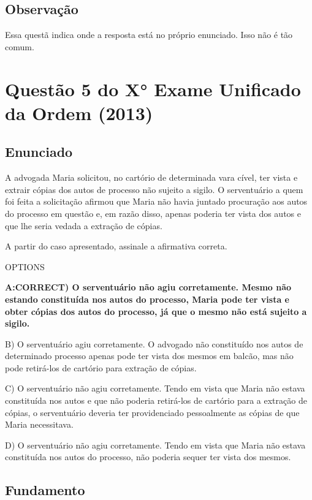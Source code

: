 \documentclass[12pt]{article}
\begin{document}
\subsection{Observação}

Essa questã indica onde a resposta está no próprio enunciado. Isso não é tão comum.

\section{Questão 5 do X° Exame Unificado da Ordem (2013)}

\subsection{Enunciado}

A advogada Maria solicitou, no cartório de determinada vara 
cível, ter vista e extrair cópias dos autos de processo não 
sujeito a sigilo. O serventuário a quem foi feita a solicitação 
afirmou que Maria não havia juntado procuração aos autos do 
processo em questão e, em razão disso, apenas poderia ter 
vista dos autos e que lhe seria vedada a extração de cópias. 
 
A partir do caso apresentado, assinale a afirmativa correta.  
 
OPTIONS

\textbf{A:CORRECT) O serventuário não agiu corretamente. Mesmo não 
estando constituída nos autos do processo, Maria pode ter 
vista e obter cópias dos autos do processo, já que o 
mesmo não está sujeito a sigilo.  }

B) O serventuário agiu corretamente. O advogado não 
constituído nos autos de determinado processo apenas 
pode ter vista dos mesmos em balcão, mas não pode 
retirá-los de cartório para extração de cópias. 

C) O serventuário não agiu corretamente. Tendo em vista que 
Maria não estava constituída nos autos e que não poderia 
retirá-los de cartório para a extração de cópias, o 
serventuário deveria ter providenciado pessoalmente as 
cópias de que Maria necessitava. 

D) O serventuário não agiu corretamente. Tendo em vista que 
Maria não estava constituída nos autos do processo, não 
poderia sequer ter vista dos mesmos.

\subsection{Fundamento}
\end{document}
